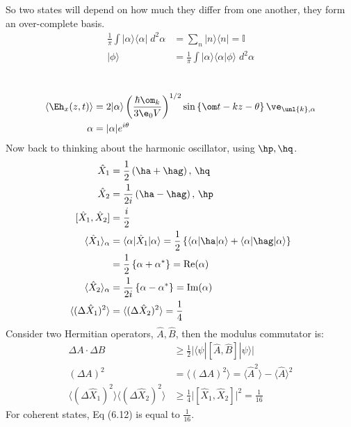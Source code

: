 \documentclass[a4paper, 11pt, normalem]{report}
\newcommand\xo{\hat{X}_1}
\newcommand\xt{\hat{X}_2}
\begin{document}
So two states will depend on how much they differ from one another, they form an over-complete basis. 
\begin{align}
    \frac{1}{\pi}\int |\alpha\rangle\langle\alpha|\;d^2\alpha &= \sum_n |n\rangle\langle n| = \mathbb{I} \\
    |\phi\rangle &= \frac{1}{\pi}\int |\alpha\rangle\langle\alpha|\phi\rangle\;d^2\alpha
\end{align}

\chapter{}
\begin{align}
    \langle\Eh_x(z,t)\rangle &= 2|\alpha\rangle\left(\frac{\hbar\om_k}{3\e_0V}\right)^{1/2}\sin\left\{\om t - kz - \theta\right\}\ve_{\unl{k},\alpha} \\ 
    \alpha &= |\alpha|e^{i\theta} 
\end{align}
Now back to thinking about the harmonic oscillator, using $\hp,\hq$.
\begin{align}
    \hat{X}_1 &= \frac12\left(\ha+\hag\right),\, \hq \\
    \hat{X}_2 &= \frac{1}{2i}\left(\ha-\hag\right),\, \hp \\
    [\hat{X}_1,\hat{X}_2] &= \frac{i}{2} \\
    \langle\xo\rangle_\alpha &= \langle\alpha|\xo|\alpha\rangle = \frac12 \left\{\langle\alpha|\ha|\alpha\rangle + \langle\alpha|\hag|\alpha\rangle\right\} \\ 
                             &= \frac12 \left\{\alpha+\alpha^*\right\} = \text{Re}(\alpha) \\
    \langle\xt\rangle_\alpha &= \frac{1}{2i}\left\{\alpha-\alpha^*\right\} = \text{Im}(\alpha) \\
    \langle(\Delta\xo)^2\rangle &= \langle(\Delta\xt)^2\rangle = \frac14
\end{align}
Consider two Hermitian operators, $\hat{A},\hat{B}$, then the modulus commutator is:
\begin{align}
    \Delta A\cdot\Delta B &\geq \frac12\Big|\langle\psi|[\hat{A},\hat{B}]|\psi\rangle\Big| \\
    (\Delta A)^2 &= \langle(\Delta A)^2\rangle = \langle\hat{A}^2\rangle - \langle\hat{A}\rangle^2\\
    \langle(\Delta\xo)^2\rangle\langle(\Delta\xt)^2\rangle &\geq \frac14\Big|[\xo,\xt]\Big|^2 = \frac{1}{16}
\end{align}
For coherent states, Eq (6.12) is equal to $\frac{1}{16}$. 
\end{document}
